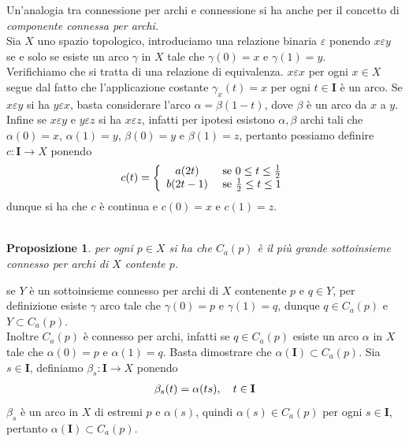 \documentclass[oneside, 11pt]{amsbook}
\makeatletter
\newcommand{\0}{{(0)}}
\newcommand{\3}{{(3)}}
\theoremstyle{colonplain}
\newtheorem{prop}[thm]{Proposizione}
\theoremstyle{colondefinition}
\theoremstyle{colonremark}
\numberwithin{equation}{chapter}
\renewcommand{\proofname}{Dimostrazione}
\renewenvironment{proof}[1][\proofname]{\par
  \pushQED{\qed}%
  \normalfont \topsep6\p@\@plus6\p@\relax
  \trivlist
  \item[\hskip\labelsep\bfseries #1:]\ignorespaces
}{%
  \popQED\endtrivlist\@endpefalse
}
\makeatother
\begin{document}
Un'analogia tra connessione per archi e connessione si ha anche per il concetto di \textit{componente connessa per archi}. \\
Sia $X$ uno spazio topologico, introduciamo una relazione binaria $\varepsilon$ ponendo $x \varepsilon y$ se e solo se esiste un arco $\gamma$ in $X$ tale che $\gamma(0) = x$ e $\gamma (1) = y$. \\
Verifichiamo che si tratta di una relazione di equivalenza. $x \varepsilon x$ per ogni $x \in X$ segue dal fatto che l'applicazione costante $\gamma_x(t) = x$ per ogni $t \in \mathbf{I}$ è un arco. Se $x \varepsilon y$ si ha $y \varepsilon x$, basta considerare l'arco $\alpha = \beta (1 - t)$, dove $\beta$ è un arco da $x$ a $y$. Infine se $x \varepsilon y$ e $y \varepsilon z$ si ha $x \varepsilon z$, infatti per ipotesi esistono $\alpha, \beta$ archi tali che $\alpha(0) = x$, $\alpha(1) = y$, $\beta(0) = y$ e $\beta(1) = z$, pertanto possiamo definire $c : \mathbf{I} \longrightarrow X$ ponendo
\begin{align}
    c(t) = \left\{ \begin{array}{cc}
         a(2t)& \text{ se } 0 \leq t \leq \frac{1}{2}  \\
         b(2t - 1)& \text{ se } \frac{1}{2} \leq t \leq 1 \notag
    \end{array} \right.
\end{align}
dunque si ha che $c$ è continua e $c(0) = x$ e $c(1) = z$.\\ \\
\begin{prop}
per ogni $p \in X$ si ha che $C_a(p)$ è il più grande sottoinsieme connesso per archi di $X$ contente $p$.
\end{prop}
\begin{proof} 
se $Y$ è un sottoinsieme connesso per archi di $X$ contenente $p$ e $q \in Y$, per definizione esiste $\gamma$ arco tale che $\gamma(0) = p$ e $\gamma(1) = q$, dunque $q \in C_a(p)$ e $Y \subset C_a(p)$. \\
Inoltre $C_a(p)$ è connesso per archi, infatti se $q \in C_a(p)$ esiste un arco $\alpha$ in $X$ tale che $\alpha(0) = p$ e $\alpha(1) = q$. Basta dimostrare che $\alpha(\mathbf{I}) \subset C_a(p)$. Sia $s \in \mathbf{I}$, definiamo $\beta_s : \mathbf{I} \longrightarrow X$ ponendo
\begin{align}
    \beta_s(t) = \alpha(ts), \quad t \in \mathbf{I} \notag
\end{align}
$\beta_s$ è un arco in $X$ di estremi $p$ e $\alpha(s)$, quindi $\alpha(s) \in C_a(p)$ per ogni $s \in \mathbf{I}$, pertanto $\alpha(\mathbf{I}) \subset C_a(p)$. \end{proof}
\end{document}
